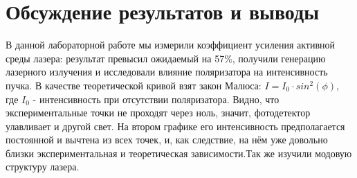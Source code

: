 \section*{Обсуждение результатов и выводы}

В данной лабораторной работе мы измерили коэффициент усиления активной среды лазера: результат превысил ожидаемый на 57\%, получили генерацию лазерного излучения и исследовали влияние поляризатора на интенсивность пучка. В качестве теоретической кривой взят закон Малюса: $I = I_0 \cdot  sin^{2}(\phi)$, где $I_0$ - интенсивность при отсутствии поляризатора. Видно, что экспериментальные точки не проходят через ноль, значит, фотодетектор улавливает и другой свет. На втором графике его интенсивность предполагается постоянной и вычтена из всех точек, и, как следствие, на нём уже довольно близки экспериментальная и теоретическая зависимости.Так же изучили модовую структуру лазера.